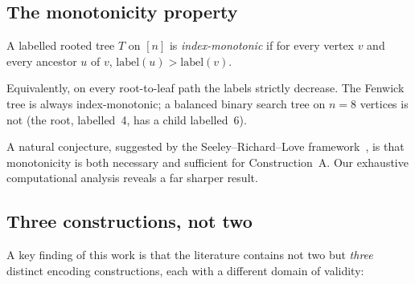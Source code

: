 %

\subsection{The monotonicity property}
\label{sec:pb-mono}

\begin{definition}
\label{def:monotonic}
A labelled rooted tree $T$ on $[n]$ is \emph{index-monotonic} if for
every vertex $v$ and every ancestor $u$ of $v$,
$\mathrm{label}(u) > \mathrm{label}(v)$.
\end{definition}

Equivalently, on every root-to-leaf path the labels strictly decrease.
The Fenwick tree is always index-monotonic; a balanced binary search
tree on $n = 8$ vertices is not (the root, labelled~4, has a child
labelled~6).

A natural conjecture, suggested by the Seeley--Richard--Love
framework~\cite{seeley2012}, is that monotonicity is both necessary
and sufficient for Construction~A.  Our exhaustive computational
analysis reveals a far sharper result.

\subsection{Three constructions, not two}
\label{sec:pb-three}

A key finding of this work is that the literature contains not two but
\emph{three} distinct encoding constructions, each with a different
domain of validity:

